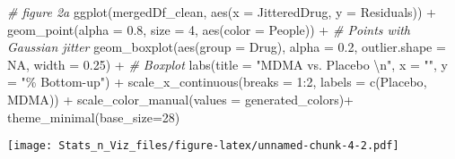 \documentclass[
]{article}
\newenvironment{Shaded}{\begin{snugshade}}{\end{snugshade}}
\newcommand{\AttributeTok}[1]{\textcolor[rgb]{0.77,0.63,0.00}{#1}}
\newcommand{\CommentTok}[1]{\textcolor[rgb]{0.56,0.35,0.01}{\textit{#1}}}
\newcommand{\ConstantTok}[1]{\textcolor[rgb]{0.00,0.00,0.00}{#1}}
\newcommand{\DecValTok}[1]{\textcolor[rgb]{0.00,0.00,0.81}{#1}}
\newcommand{\FloatTok}[1]{\textcolor[rgb]{0.00,0.00,0.81}{#1}}
\newcommand{\FunctionTok}[1]{\textcolor[rgb]{0.00,0.00,0.00}{#1}}
\newcommand{\NormalTok}[1]{#1}
\newcommand{\SpecialCharTok}[1]{\textcolor[rgb]{0.00,0.00,0.00}{#1}}
\newcommand{\StringTok}[1]{\textcolor[rgb]{0.31,0.60,0.02}{#1}}
\begin{document}
\begin{Shaded}
\begin{Highlighting}[]
\CommentTok{\# figure 2a}
\FunctionTok{ggplot}\NormalTok{(mergedDf\_clean, }\FunctionTok{aes}\NormalTok{(}\AttributeTok{x =}\NormalTok{ JitteredDrug, }\AttributeTok{y =}\NormalTok{ Residuals)) }\SpecialCharTok{+}
  \FunctionTok{geom\_point}\NormalTok{(}\AttributeTok{alpha =} \FloatTok{0.8}\NormalTok{, }\AttributeTok{size =} \DecValTok{4}\NormalTok{, }\FunctionTok{aes}\NormalTok{(}\AttributeTok{color =}\NormalTok{ People)) }\SpecialCharTok{+}  \CommentTok{\# Points with Gaussian jitter}
  \FunctionTok{geom\_boxplot}\NormalTok{(}\FunctionTok{aes}\NormalTok{(}\AttributeTok{group =}\NormalTok{ Drug), }\AttributeTok{alpha =} \FloatTok{0.2}\NormalTok{, }\AttributeTok{outlier.shape =} \ConstantTok{NA}\NormalTok{, }\AttributeTok{width =} \FloatTok{0.25}\NormalTok{) }\SpecialCharTok{+}  \CommentTok{\# Boxplot}
  \FunctionTok{labs}\NormalTok{(}\AttributeTok{title =} \StringTok{"MDMA vs. Placebo }\SpecialCharTok{\textbackslash{}n}\StringTok{"}\NormalTok{,}
       \AttributeTok{x =} \StringTok{""}\NormalTok{,}
       \AttributeTok{y =} \StringTok{"\% Bottom{-}up"}\NormalTok{) }\SpecialCharTok{+} 
  \FunctionTok{scale\_x\_continuous}\NormalTok{(}\AttributeTok{breaks =} \DecValTok{1}\SpecialCharTok{:}\DecValTok{2}\NormalTok{, }\AttributeTok{labels =} \FunctionTok{c}\NormalTok{(}\StringTok{\textquotesingle{}Placebo\textquotesingle{}}\NormalTok{, }\StringTok{\textquotesingle{}MDMA\textquotesingle{}}\NormalTok{)) }\SpecialCharTok{+}
  \FunctionTok{scale\_color\_manual}\NormalTok{(}\AttributeTok{values =}\NormalTok{ generated\_colors)}\SpecialCharTok{+}
  \FunctionTok{theme\_minimal}\NormalTok{(}\AttributeTok{base\_size=}\DecValTok{28}\NormalTok{)}
\end{Highlighting}
\end{Shaded}

\texttt{[image: Stats\_n\_Viz\_files/figure-latex/unnamed-chunk-4-2.pdf]}
\end{document}
